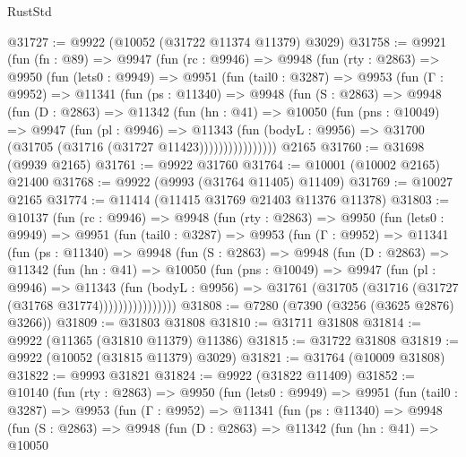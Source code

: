 \begin{lexlean}{RustStd}
\begin{coremodule}
@31727 := @9922 (@10052 (@31722 @11374 @11379) @3029)
@31758 := @9921
    (fun (fn : @89) =>
    @9947
      (fun (rc : @9946) =>
      @9948
        (fun (rty : @2863) =>
        @9950
          (fun (lets0 : @9949) =>
          @9951
            (fun (tail0 : @3287) =>
            @9953
              (fun (Γ : @9952) =>
              @11341
                (fun (ps : @11340) =>
                @9948
                  (fun (S : @2863) =>
                  @9948
                    (fun (D : @2863) =>
                    @11342
                      (fun (hn : @41) =>
                      @10050
                        (fun (pns : @10049) =>
                        @9947
                          (fun (pl : @9946) =>
                          @11343
                            (fun (bodyL : @9956) =>
                            @31700 (@31705 (@31716 (@31727 @11423))))))))))))))))
    @2165
@31760 := @31698 (@9939 @2165)
@31761 := @9922 @31760
@31764 := @10001 (@10002 @2165) @21400
@31768 := @9922 (@9993 (@31764 @11405) @11409)
@31769 := @10027 @2165
@31774 := @11414 (@11415 @31769 @21403 @11376 @11378)
@31803 := @10137
    (fun (rc : @9946) =>
    @9948
      (fun (rty : @2863) =>
      @9950
        (fun (lets0 : @9949) =>
        @9951
          (fun (tail0 : @3287) =>
          @9953
            (fun (Γ : @9952) =>
            @11341
              (fun (ps : @11340) =>
              @9948
                (fun (S : @2863) =>
                @9948
                  (fun (D : @2863) =>
                  @11342
                    (fun (hn : @41) =>
                    @10050
                      (fun (pns : @10049) =>
                      @9947
                        (fun (pl : @9946) =>
                        @11343
                          (fun (bodyL : @9956) =>
                          @31761 (@31705 (@31716 (@31727 (@31768 @31774))))))))))))))))
@31808 := @7280 (@7390 (@3256 (@3625 @2876) @3266))
@31809 := @31803 @31808
@31810 := @31711 @31808
@31814 := @9922 (@11365 (@31810 @11379) @11386)
@31815 := @31722 @31808
@31819 := @9922 (@10052 (@31815 @11379) @3029)
@31821 := @31764 (@10009 @31808)
@31822 := @9993 @31821
@31824 := @9922 (@31822 @11409)
@31852 := @10140
    (fun (rty : @2863) =>
    @9950
      (fun (lets0 : @9949) =>
      @9951
        (fun (tail0 : @3287) =>
        @9953
          (fun (Γ : @9952) =>
          @11341
            (fun (ps : @11340) =>
            @9948
              (fun (S : @2863) =>
              @9948
                (fun (D : @2863) =>
                @11342
                  (fun (hn : @41) =>
                  @10050

\end{coremodule}
\end{lexlean}
